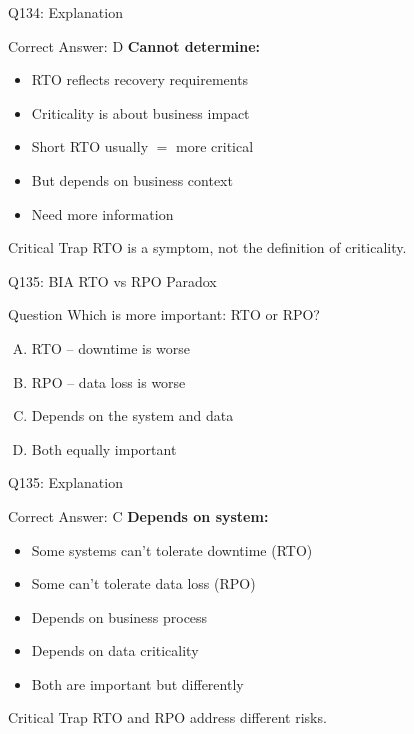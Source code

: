 \documentclass{beamer}
\begin{document}
	\begin{frame}{Q134: Explanation}
		\begin{block}{Correct Answer: D}
			\textbf{Cannot determine:}
			\begin{itemize}
				\item RTO reflects recovery requirements
				\item Criticality is about business impact
				\item Short RTO usually $=$ more critical
				\item But depends on business context
				\item Need more information
			\end{itemize}
		\end{block}
		\begin{alertblock}{Critical Trap}
			RTO is a symptom, not the definition of criticality.
		\end{alertblock}
	\end{frame}
	
	\begin{frame}{Q135: BIA RTO vs RPO Paradox}
		\begin{block}{Question}
			Which is more important: RTO or RPO?
		\end{block}
		\begin{enumerate}[(A)]
			\item RTO -- downtime is worse
			\item RPO -- data loss is worse
			\item Depends on the system and data
			\item Both equally important
		\end{enumerate}
	\end{frame}
	
	\begin{frame}{Q135: Explanation}
		\begin{block}{Correct Answer: C}
			\textbf{Depends on system:}
			\begin{itemize}
				\item Some systems can't tolerate downtime (RTO)
				\item Some can't tolerate data loss (RPO)
				\item Depends on business process
				\item Depends on data criticality
				\item Both are important but differently
			\end{itemize}
		\end{block}
		\begin{alertblock}{Critical Trap}
			RTO and RPO address different risks.
		\end{alertblock}
	\end{frame}
	
\end{document}
